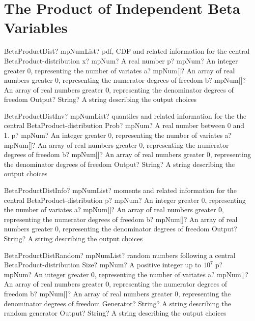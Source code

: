 \documentclass[12pt,a4paper,openany]{book}
\begin{document}
\section{The Product of Independent Beta Variables}

\begin{mpFunctionsExtract}
\mpFunctionFiveNotImplemented
{BetaProductDist? mpNumList? pdf, CDF and related information for the central BetaProduct-distribution}
{x? mpNum? A real number}
{p? mpNum? An integer greater 0, representing the number of variates}
{a? mpNum[]? An array of real numbers greater 0, representing the numerator  degrees of freedom}
{b? mpNum[]? An array of real numbers greater 0, representing the denominator degrees of freedom}
{Output? String? A string describing the output choices}
\end{mpFunctionsExtract}

\begin{mpFunctionsExtract}
\mpFunctionFiveNotImplemented
{BetaProductDistInv? mpNumList? quantiles and related information for the the central BetaProduct-distribution}
{Prob? mpNum? A real number between 0 and 1.}
{p? mpNum? An integer greater 0, representing the number of variates}
{a? mpNum[]? An array of real numbers greater 0, representing the numerator  degrees of freedom}
{b? mpNum[]? An array of real numbers greater 0, representing the denominator degrees of freedom}
{Output? String? A string describing the output choices}
\end{mpFunctionsExtract}

\begin{mpFunctionsExtract}
\mpFunctionFourNotImplemented
{BetaProductDistInfo? mpNumList? moments and related information for the central BetaProduct-distribution}
{p? mpNum? An integer greater 0, representing the number of variates}
{a? mpNum[]? An array of real numbers greater 0, representing the numerator  degrees of freedom}
{b? mpNum[]? An array of real numbers greater 0, representing the denominator degrees of freedom}
{Output? String? A string describing the output choices}
\end{mpFunctionsExtract}

\begin{mpFunctionsExtract}
\mpFunctionSixNotImplemented
{BetaProductDistRandom? mpNumList? random numbers following a central BetaProduct-distribution}
{Size? mpNum? A positive integer up to $10^7$}
{p? mpNum? An integer greater 0, representing the number of variates}
{a? mpNum[]? An array of real numbers greater 0, representing the numerator  degrees of freedom}
{b? mpNum[]? An array of real numbers greater 0, representing the denominator degrees of freedom}
{Generator? String? A string describing the random generator}
{Output? String? A string describing the output choices}
\end{mpFunctionsExtract}
\end{document}
